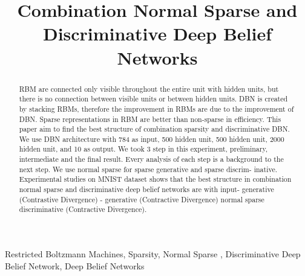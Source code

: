 \documentclass[conference]{IEEEtran}
\begin{document}
\title{Combination Normal Sparse and Discriminative Deep Belief Networks}

\author{
\and

}

\maketitle

\begin{abstract}
RBM are connected only visible
throughout the entire unit with hidden units, but there is no
connection between visible units or between hidden units. DBN is created by stacking RBMs, therefore the
improvement in RBMs are due to the improvement of DBN. Sparse representations in RBM are better than non-sparse in efficiency. This paper aim to find the best structure of
combination sparsity and discriminative DBN. We use DBN
architecture with 784 as input, 500 hidden unit, 500 hidden
unit, 2000 hidden unit, and 10 as output. We took 3 step in
this experiment, preliminary, intermediate and the final result.
Every analysis of each step is a background to the next step.
We use normal sparse for sparse generative and sparse discrim-
inative. Experimental studies on MNIST dataset shows that the
best structure in combination normal sparse and discriminative
deep belief networks are with input- generative (Contrastive
Divergence) - generative (Contractive Divergence) normal sparse
discriminative (Contractive Divergence).
\end{abstract}

\begin{IEEEkeywords}
Restricted Boltzmann Machines, Sparsity, Normal Sparse , Discriminative Deep Belief Network, Deep Belief Networks
\end{IEEEkeywords}

\IEEEpeerreviewmaketitle
\end{document}
